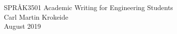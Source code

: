 \documentclass[a4paper]{article}
\begin{document}
\begin{titlepage}
\begin{center}
\Large SPRÅK3501 Academic Writing for Engineering Students \\
\vspace{10pt}
\large Carl Martin Krokeide \\
\vspace{10pt}
\large August 2019 
\end{center}
\end{titlepage}




\newpage



\newpage


 
\newpage



\end{document}
